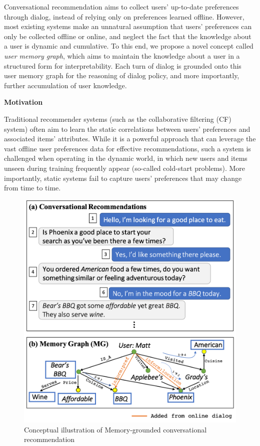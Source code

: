 Conversational recommendation aims to collect users' up-to-date preferences through dialog, instead of relying only on preferences learned offline.
However, most existing systems make an unnatural assumption that users' preferences can only be collected offline or online, and neglect the fact that the knowledge about a user is dynamic and cumulative.
To this end, we propose a novel concept called \textit{user memory graph}, which aims to maintain the knowledge about a user in a structured form for interpretability.
Each turn of dialog is grounded onto this user memory graph for the reasoning of dialog policy, and more importantly, further accumulation of user knowledge.

\textbf{Motivation}

Traditional recommender systems (such as the collaborative filtering (CF) system) often aim to learn the static correlations between users' preferences and associated items' attributes.
While it is a powerful approach that can leverage the vast offline user preferences data for effective recommendations, such a system is challenged when operating in the dynamic world, in which new users and items unseen during training frequently appear (so-called cold-start problems).
More importantly, static systems fail to capture users' preferences that may change from time to time.

\begin{figure}
\centering    
\includegraphics[width=0.9\columnwidth]{fig/acl19_teaser.png}
    \caption{Conceptual illustration of Memory-grounded conversational recommendation}
\label{fig:dialog}
\vspace{-3mm}
\end{figure}

